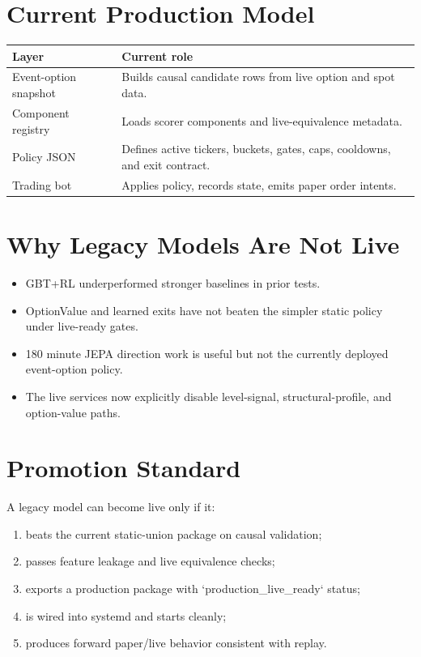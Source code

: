 \documentclass[11pt,a4paper]{article}
\begin{document}
\section{Current Production Model}

\begin{center}
\begin{tabularx}{\textwidth}{lX}
\toprule
Layer & Current role \\
\midrule
Event-option snapshot & Builds causal candidate rows from live option and spot data. \\
Component registry & Loads scorer components and live-equivalence metadata. \\
Policy JSON & Defines active tickers, buckets, gates, caps, cooldowns, and exit contract. \\
Trading bot & Applies policy, records state, emits paper order intents. \\
\bottomrule
\end{tabularx}
\end{center}

\section{Why Legacy Models Are Not Live}

\begin{itemize}
  \item GBT+RL underperformed stronger baselines in prior tests.
  \item OptionValue and learned exits have not beaten the simpler static policy under live-ready gates.
  \item 180 minute JEPA direction work is useful but not the currently deployed event-option policy.
  \item The live services now explicitly disable level-signal, structural-profile, and option-value paths.
\end{itemize}

\section{Promotion Standard}

A legacy model can become live only if it:

\begin{enumerate}
  \item beats the current static-union package on causal validation;
  \item passes feature leakage and live equivalence checks;
  \item exports a production package with `production\_live\_ready` status;
  \item is wired into systemd and starts cleanly;
  \item produces forward paper/live behavior consistent with replay.
\end{enumerate}
\end{document}
